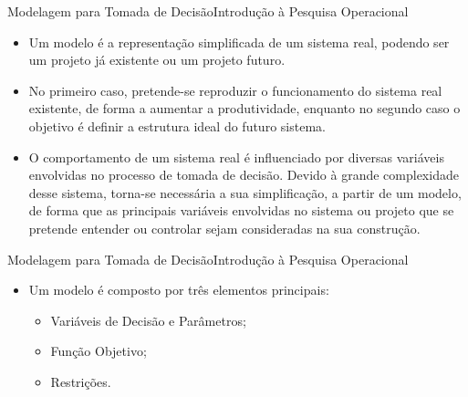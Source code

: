 \documentclass[t]{beamer}
\begin{document}
\begin{ftst}{Modelagem para Tomada de Decisão}{Introdução à Pesquisa Operacional}
\small
\begin{itemize}
    \item Um modelo é a representação simplificada de um sistema real, podendo ser um projeto já existente ou um projeto futuro.
    \vone
    \item No primeiro caso, pretende-se reproduzir o funcionamento do sistema real existente, de forma a aumentar a produtividade, enquanto no segundo caso o objetivo é definir a estrutura ideal do futuro sistema. 
    \vone
    \item O comportamento de um sistema real é influenciado por diversas variáveis envolvidas no processo de tomada de decisão. Devido à grande complexidade desse sistema, torna-se necessária a sua simplificação, a partir de um modelo, de forma que as principais variáveis envolvidas no sistema ou projeto que se pretende entender ou controlar sejam consideradas na sua construção.
\end{itemize}

\end{ftst}


\begin{ftst}{Modelagem para Tomada de Decisão}{Introdução à Pesquisa Operacional}

\begin{itemize}
    \item Um modelo é composto por três elementos principais: 
    \vone
    \begin{itemize}
        \item[a.] Variáveis de Decisão e Parâmetros;
        \vone
        \item[b.] Função Objetivo;
        \vone
        \item[c.] Restrições.
    \end{itemize}
    
\end{itemize}

\end{ftst}

\end{document}
